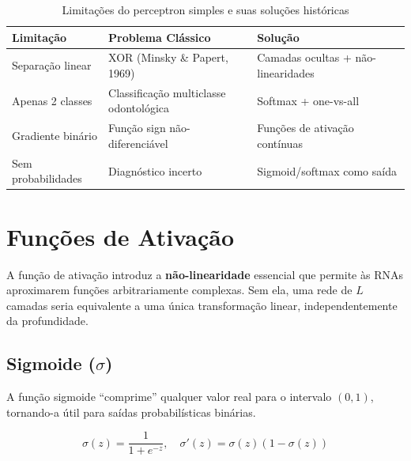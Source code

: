\begin{table}[H]
  \centering
  \caption{Limitações do perceptron simples e suas soluções históricas}
  \label{tab:limitacoes-perceptron}
  \begin{tabularx}{\textwidth}{p{3.5cm}XX}
    \toprule
    \textbf{Limitação} & \textbf{Problema Clássico} & \textbf{Solução} \\
    \midrule
    Separação linear & XOR (Minsky \& Papert, 1969) & Camadas ocultas + não-linearidades \\
    Apenas 2 classes & Classificação multiclasse odontológica & Softmax + one-vs-all \\
    Gradiente binário & Função sign não-diferenciável & Funções de ativação contínuas \\
    Sem probabilidades & Diagnóstico incerto & Sigmoid/softmax como saída \\
    \bottomrule
  \end{tabularx}
\end{table}


\section{Funções de Ativação}
\label{sec:funcoes-ativacao}

A função de ativação introduz a \textbf{não-linearidade} essencial que permite às RNAs
aproximarem funções arbitrariamente complexas. Sem ela, uma rede de $L$ camadas seria
equivalente a uma única transformação linear, independentemente da profundidade.

\subsection{Sigmoide ($\sigma$)}

A função sigmoide ``comprime'' qualquer valor real para o intervalo $(0, 1)$,
tornando-a útil para saídas probabilísticas binárias.

\begin{equation}
  \sigma(z) = \frac{1}{1 + e^{-z}}, \quad \sigma'(z) = \sigma(z)(1 - \sigma(z))
  \label{eq:sigmoide}
\end{equation}


